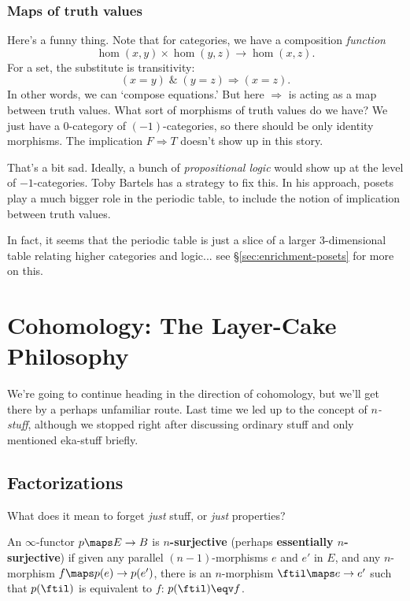 \documentclass[12pt]{amsart}
\begin{document}
\subsubsection{Maps of truth values}
\label{sec:maps-truth-values}

Here's a funny thing.
Note that for categories, we have a composition \emph{function}
$$\hom(x,y)\times\hom(y,z)\to \hom(x,z).$$
For a set, the substitute is transitivity:
$$(x=y) \; \& \; (y=z) \Rightarrow (x=z).$$
In other words, we can `compose equations.'
But here $\Rightarrow$ is acting as a map between truth values.
What sort of morphisms of truth values do we have?  We just have a
0-category of $(-1)$-categories, so there should be only identity morphisms.
The implication $F \Rightarrow T$ doesn't show up in this story.

That's a bit sad.  Ideally, a bunch of
\emph{propositional logic} would show up at the level of $-1$-categories.
Toby Bartels has a strategy to fix this.  In his approach, posets
play a much bigger role in the periodic table, to include the
notion of implication between truth values.   

In fact, it seems that the periodic table is just a slice of
a larger 3-dimensional table relating higher categories and logic...
see \S\ref{sec:enrichment-posets} for more on this. 

\section{Cohomology: The Layer-Cake Philosophy}
\label{sec:fact-postn-towers}

We're going to continue heading in the direction of cohomology, but
we'll get there by a perhaps unfamiliar route.  Last time we led up to 
the concept of \emph{$n$-stuff}, although we stopped right after
discussing ordinary stuff and only mentioned eka-stuff briefly.


\subsection{Factorizations}
\label{sec:factorizations}

What does it mean to forget \emph{just} stuff, or \emph{just}
properties?

\begin{defn}
  An $\infty$-functor $p\maps E\to B$ is \textbf{$n$-surjective} (perhaps
  \textbf{essentially $n$-surjective}) if given any parallel
  $(n-1)$-morphisms $e$ and $e'$ in $E$, and any $n$-morphism $f\maps p(e)\to
  p(e')$, there is an $n$-morphism $\ftil\maps e\to e'$ such that $p(\ftil)$
  is equivalent to $f$: $p(\ftil)\eqv f$.   
\end{defn}
\end{document}
